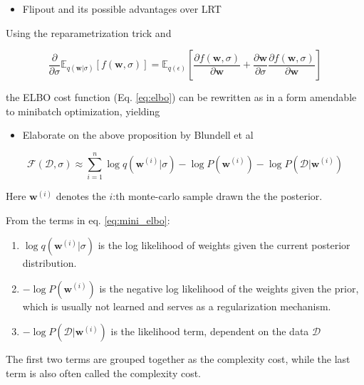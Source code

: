 	\begin{itemize}
		\item Flipout and its possible advantages over LRT
	\end{itemize}
	
	Using the reparametrization trick and 
	
	\begin{equation}
	\frac{\partial}{\partial \sigma} \mathbb{E}_{q(\pmb{w}|\sigma)}[f(\pmb{w}, \sigma)] =
	\mathbb{E}_{q(\epsilon)}[\frac{\partial f(\pmb{w}, \sigma)}{\partial \pmb{w}} + \frac{\partial \pmb{w}}{\partial \sigma}
	\frac{\partial f(\pmb{w}, \sigma)}{\partial \pmb{w}}]
	\end{equation}
	
	the ELBO cost function (Eq. \ref{eq:elbo}) can be rewritten as in a form amendable to minibatch optimization, yielding
	
	\begin{itemize}
		\item Elaborate on the above proposition by Blundell et al
	\end{itemize}
	
	\begin{equation}
	\label{eq:mini_elbo}
	\mathcal{F}(\mathcal{D}, \sigma) \approx \sum_{i=1}^{n}\log q(\pmb{w}^{(i)}|\sigma) - \log P(\pmb{w}^{(i)}) - \log P(\mathcal{D}|\pmb{w}^{(i)})
	\end{equation}
	
	Here $\pmb{w}^{(i)}$ denotes the $i$:th monte-carlo sample drawn the the posterior.
	
	From the terms in eq. \ref{eq:mini_elbo}:
	\begin{enumerate}
		\item $\log q(\pmb{w}^{(i)}|\sigma)$ is the log likelihood of weights given the current posterior distribution.
		
		\item $-\log P(\pmb{w}^{(i)})$ is the negative log likelihood of the weights given the prior, which is usually not learned and serves as a regularization mechanism. 
		
		\item $- \log P(\mathcal{D}|\pmb{w}^{(i)})$ is the likelihood term, dependent on the data $\mathcal{D}$
	\end{enumerate}
	
	\vspace*{2mm}
	The first two terms are grouped together as the complexity cost, while the last term is also often called the complexity cost. 
	
